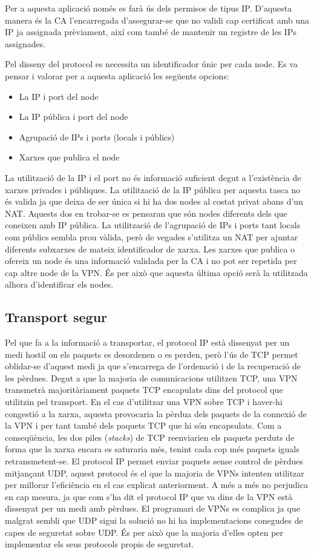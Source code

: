 Per a aquesta aplicació només es farà ús dels permisos de tipus IP. D'aquesta manera és la CA l'encarregada d'assegurar-se que no validi cap certificat amb una IP ja assignada prèviament, així com també de mantenir un registre de les IPs assignades.

Pel disseny del protocol es necessita un identificador únic per cada node. Es va pensar i valorar per a aquesta aplicació les següents opcions:
\begin{itemize}
\item La IP i port del node
\item La IP pública i port del node
\item Agrupació de IPs i ports (locals i públics)
\item Xarxes que publica el node
\end{itemize}
La utilització de la IP i el port no és informació suficient degut a l'existència de xarxes privades i públiques. %
La utilització de la IP pública per aquesta tasca no és valida ja que deixa de ser única si hi ha dos nodes al costat privat abans d'un NAT. Aquests dos en trobar-se es pensaran que són nodes diferents dels que coneixen amb IP pública.
La utilització de l'agrupació de IPs i ports tant locals com públics sembla prou vàlida, però de vegades s'utilitza un NAT per ajuntar diferents subxarxes de mateix identificador de xarxa.
Les xarxes que publica o ofereix un node és una informació validada per la CA i no pot ser repetida per cap altre node de la VPN. És per això que aquesta última opció serà la utilitzada alhora d'identificar els nodes.

\subsection{Transport segur} %
Pel que fa a la informació a transportar, el protocol IP està dissenyat per un medi hostil on els paquets es desordenen o es perden, però l'ús de TCP permet oblidar-se d'aquest medi ja que s'encarrega de l'ordenació i de la recuperació de les pèrdues. Degut a que la majoria de comunicacions utilitzen TCP, una VPN transmetrà majoritàriament paquets TCP encapulats dins del protocol que utilitzin pel transport.
En el cas d'utilitzar una VPN sobre TCP i haver-hi congestió a la xarxa, aquesta provocaria la pèrdua dels paquets de la connexió de la VPN i per tant també dels paquets TCP que hi són encapsulats. Com a conseqüència, les dos piles (\emph{stacks}) de TCP reenviarien els paquets perduts de forma que la xarxa encara es saturaria més, tenint cada cop més paquets iguals retransmetent-se.
El protocol IP permet enviar paquets sense control de pèrdues mitjançant UDP, aquest protocol és el que la majoria de VPNs intenten utilitzar per millorar l'eficiència en el cas explicat anteriorment. A més a més no  perjudica en cap mesura, ja que com s'ha dit el protocol IP que va dins de la VPN està dissenyat per un medi amb pèrdues.
El programari de VPNs es complica ja que malgrat sembli que UDP sigui la solució no hi ha implementacions conegudes de capes de seguretat sobre UDP. És per això que la majoria d'elles opten per implementar els seus protocols propis de seguretat.

